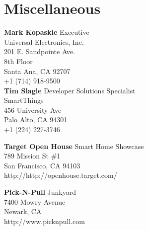 \section{Miscellaneous}

\vspace{5mm} %
\textbf{Mark Kopaskie} Executive\\
Universal Electronics, Inc.\\
201 E. Sandpointe Ave.\\
8th Floor\\
Santa Ana, CA 92707\\
+1 (714) 918-9500\\

\vspace{5mm} %
\noindent\textbf{Tim Slagle} Developer Solutions Specialist\\
SmartThings\\
456 University Ave\\
Palo Alto, CA 94301\\
+1 (224) 227-3746

\vspace{5mm} %
\noindent\textbf{Target Open House} Smart Home Showcase\\
789 Mission St \#1\\
San Francisco, CA 94103\\
http://http://openhouse.target.com/

\vspace{5mm} %
\noindent\textbf{Pick-N-Pull} Junkyard\\
7400 Mowry Avenue\\
Newark, CA\\
http://www.picknpull.com\\

